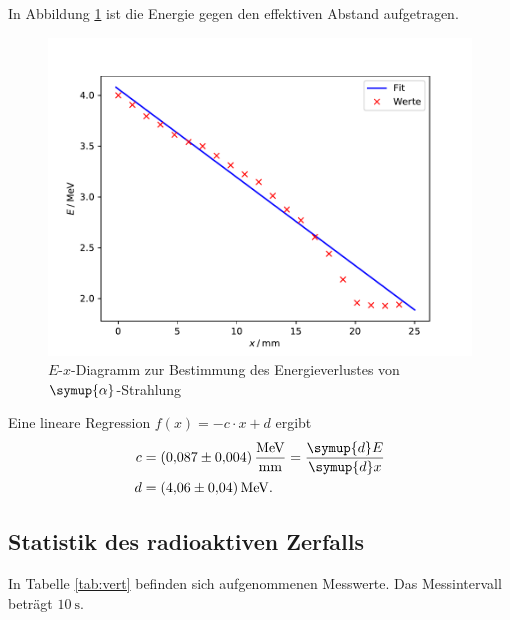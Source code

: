 In Abbildung \ref{fig:energie24mm} ist die Energie gegen den effektiven Abstand aufgetragen.
\begin{figure}[H]
  \centering
  \includegraphics[width=\textwidth]{Plots/energie24mm.pdf}
  \caption{$E$-$x$-Diagramm zur Bestimmung des Energieverlustes von $\symup{\alpha}$-Strahlung}
  \label{fig:energie24mm}
\end{figure}

Eine lineare Regression $f(x) = -c \cdot x + d$ ergibt
\begin{align*}
  c &= \SI{0,087(4)}{\MeV \per \mm} = \frac{\symup{d} E}{\symup{d} x} \\
  d &= \SI{4,06(4)}{\MeV}.
\end{align*}

\subsection{Statistik des radioaktiven Zerfalls}

In Tabelle \ref{tab:vert} befinden sich aufgenommenen Messwerte. Das Messintervall beträgt $\SI{10}{\s}$.


